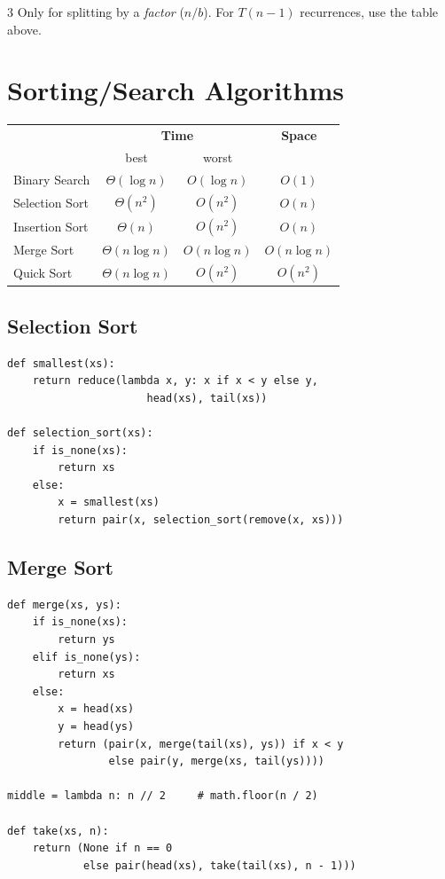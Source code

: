 \documentclass[9pt,landscape]{extarticle}
\begin{document}
\begin{multicols*}{3}
Only for splitting by a \emph{factor} ($n/b$). For $T(n-1)$ recurrences, use the table above.

\section*{Sorting/Search Algorithms}
{\small
\begin{tabular}{@{}lccc@{}}
\toprule
 & \multicolumn{2}{c}{\textbf{Time}} & \textbf{Space} \\
 & best & worst & \\
\midrule
Binary Search & $\Theta(\log n)$ & $O(\log n)$ & $O(1)$ \\
\rowcolor{rowgray} Selection Sort & $\Theta(n^2)$ & $O(n^2)$ & $O(n)$ \\
Insertion Sort & $\Theta(n)$ & $O(n^2)$ & $O(n)$ \\
\rowcolor{rowgray} Merge Sort & $\Theta(n\log n)$ & $O(n\log n)$ & $O(n\log n)$ \\
Quick Sort & $\Theta(n\log n)$ & $O(n^2)$ & $O(n^2)$ \\
\bottomrule
\end{tabular}}

\subsection*{Selection Sort}
\begin{lstlisting}
def smallest(xs):
    return reduce(lambda x, y: x if x < y else y,
                      head(xs), tail(xs))

def selection_sort(xs):
    if is_none(xs):
        return xs
    else:
        x = smallest(xs)
        return pair(x, selection_sort(remove(x, xs)))
\end{lstlisting}

\subsection*{Merge Sort}
\begin{lstlisting}
def merge(xs, ys):
    if is_none(xs):
        return ys
    elif is_none(ys):
        return xs
    else:
        x = head(xs)
        y = head(ys)
        return (pair(x, merge(tail(xs), ys)) if x < y
                else pair(y, merge(xs, tail(ys))))

middle = lambda n: n // 2     # math.floor(n / 2)

def take(xs, n):
    return (None if n == 0
            else pair(head(xs), take(tail(xs), n - 1)))


\end{lstlisting}
\end{multicols*}
\end{document}
